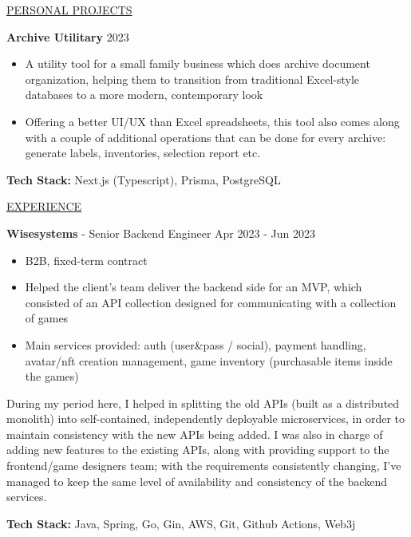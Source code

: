 \documentclass[11pt]{article}
\newcommand{\betteruline}[1]{
    \uline{#1}
}
\newcommand{\sectiontitle}[1]{
    \begingroup
        \titlebold
        \betteruline{\Large\uppercase{#1}  }
        \vspace{1.7mm}
    \endgroup
}
\newcommand{\sectioncontent}[1]{
    \begingroup
        \begin{FlushLeft}
        \vspace{-3mm}
        \sffamily\small#1
        \end{FlushLeft}
    \endgroup
    \vspace{2mm}
}
\newcommand{\job}[3]{
    \begingroup
        \textbf{\small#1} - \small#2
        \hfill\color{black!70}\small{#3}
    \endgroup
}
\newcommand{\project}[2]{
    \begingroup
        \textbf{\small#1}
        \hfill\color{black!70}\small{#2}
    \endgroup
}
\newcommand{\spacevv}{
    \vspace{2mm}
}
\begin{document}
\begin{paracol}{2}
    \spacevv
    \spacevv

    \sectiontitle{personal projects}
    \sectioncontent{
        \project{Archive Utilitary} {2023}
        \spacevv
        \begin{itemize}
            \item A utility tool for a small family business which does archive document organization, helping them to transition from traditional Excel-style databases to a more modern, contemporary look 
            \spacevv
            \item Offering a better UI/UX than Excel spreadsheets, this tool also comes along with a couple of additional operations that can be done for every archive: generate labels, inventories, selection report etc.
        \end{itemize}
        \item \textbf{Tech Stack:} Next.js (Typescript), Prisma, PostgreSQL
        \spacevv
    }

    \switchcolumn
    \sectiontitle{experience}
    \sectioncontent{
      \job{Wisesystems}{Senior Backend Engineer}{Apr 2023 - Jun 2023}
      \begin{itemize}
          \item B2B, fixed-term contract
          \item Helped the client’s team deliver the backend side for an MVP, which consisted of an API collection designed for communicating with a collection of games
          \item Main services provided: auth (user&pass / social), payment handling, avatar/nft creation management, game inventory (purchasable items inside the games)
      \end{itemize}
      \item During my period here, I helped in splitting the old APIs (built as a               distributed monolith) into self-contained, independently deployable                 microservices, in order to maintain consistency with the new APIs being added.
            I was also in charge of adding new features to the existing APIs, along with providing support to the frontend/game designers team; with the requirements consistently changing, I’ve managed to keep the same level of availability and consistency of the backend services.
      \item \textbf{Tech Stack:} Java, Spring, Go, Gin, AWS, Git, Github Actions, Web3j
      \spacevv
      \spacevv
      \spacevv
      
}
\end{paracol}
\end{document}
